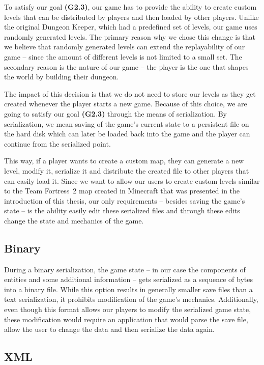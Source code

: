 To satisfy our goal \textbf{(G2.3)}, our game has to provide the ability to create custom levels that can be distributed by
players and then loaded by other players. Unlike the original Dungeon Keeper, which had a predefined set of levels, our game uses
randomly generated levels. The primary reason why we chose this change is that we believe that randomly generated levels can extend the
replayability of our game -- since the amount of different levels is not limited to a small set. The secondary reason is the nature of
our game -- the player is the one that shapes the world by building their dungeon.

The impact of this decision is that we do not need to store our levels as they get created whenever the player starts a new game. 
Because of this choice, we are going to satisfy our goal \textbf{(G2.3)} through the means of serialization. By serialization, we mean
saving of the game's current state to a persistent file on the hard disk which can later be loaded back into the game and the player
can continue from the serialized point.

This way, if a player wants to create a custom map, they can generate a new level, modify it, serialize it and distribute the created
file to other players that can easily load it. Since we want to allow our users to create custom levels similar to the Team Fortress~2
map created in Minecraft that was presented in the introduction of this thesis, our only requirements -- besides saving the game's state --
is the ability easily edit these serialized files and through these edits change the state and mechanics of the game.

\subsection{Binary}

During a binary serialization, the game state -- in our case the components of entities and some additional information -- gets
serialized as a sequence of bytes into a binary file. While this option results in generally smaller save files than a text serialization,
it prohibits modification of the game's mechanics. Additionally, even though this format allows our players to modify the
serialized game state, these modification would require an application that would parse the save file, allow the user
to change the data and then serialize the data again.

\subsection{XML}

